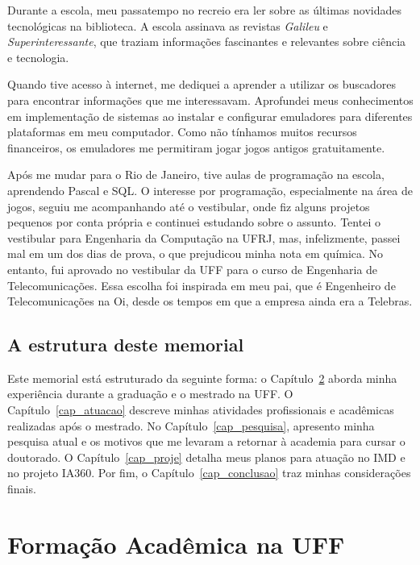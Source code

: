 \documentclass[10pt,a4paper,oneside]{book}
\begin{document}
Durante a escola, meu passatempo no recreio era ler sobre as últimas novidades tecnológicas na biblioteca. A escola assinava as revistas \textit{Galileu} e \textit{Superinteressante}, que traziam informações fascinantes e relevantes sobre ciência e tecnologia.

Quando tive acesso à internet, me dediquei a aprender a utilizar os buscadores para encontrar informações que me interessavam. Aprofundei meus conhecimentos em implementação de sistemas ao instalar e configurar emuladores para diferentes plataformas em meu computador. Como não tínhamos muitos recursos financeiros, os emuladores me permitiram jogar jogos antigos gratuitamente.

Após me mudar para o Rio de Janeiro, tive aulas de programação na escola, aprendendo Pascal e SQL. O interesse por programação, especialmente na área de jogos, seguiu me acompanhando até o vestibular, onde fiz alguns projetos pequenos por conta própria e continuei estudando sobre o assunto. Tentei o vestibular para Engenharia da Computação na UFRJ, mas, infelizmente, passei mal em um dos dias de prova, o que prejudicou minha nota em química. No entanto, fui aprovado no vestibular da UFF para o curso de Engenharia de Telecomunicações. Essa escolha foi inspirada em meu pai, que é Engenheiro de Telecomunicações na Oi, desde os tempos em que a empresa ainda era a Telebras.

\section{A estrutura deste memorial}

Este memorial está estruturado da seguinte forma: o Capítulo~\ref{cap_uff} aborda minha experiência durante a graduação
e o mestrado na UFF. O Capítulo~\ref{cap_atuacao} descreve minhas atividades profissionais e acadêmicas realizadas após
o mestrado. No Capítulo~\ref{cap_pesquisa}, apresento minha pesquisa atual e os motivos que me levaram a retornar à
academia para cursar o doutorado. O Capítulo~\ref{cap_proje} detalha meus planos para atuação no IMD e no projeto IA360.
Por fim, o Capítulo~\ref{cap_conclusao} traz minhas considerações finais.


\chapter{Formação Acadêmica na UFF}
\label{cap_uff}
\end{document}

